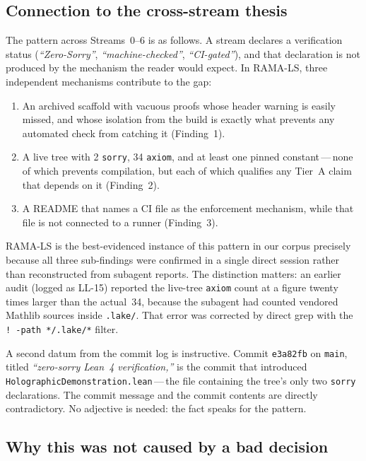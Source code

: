 \subsection*{Connection to the cross-stream thesis}

The pattern across Streams~0--6 is as follows.
A stream declares a verification status (\textit{``Zero-Sorry''},
\textit{``machine-checked''}, \textit{``CI-gated''}), and that
declaration is not produced by the mechanism the reader would expect.
In RAMA-LS, three independent mechanisms contribute to the gap:
\begin{enumerate}
  \item An archived scaffold with vacuous proofs whose header warning
    is easily missed, and whose isolation from the build is exactly what
    prevents any automated check from catching it (Finding~1).
  \item A live tree with 2 \texttt{sorry}, 34 \texttt{axiom}, and at
    least one pinned constant\,---\,none of which prevents compilation,
    but each of which qualifies any Tier~A claim that depends on it
    (Finding~2).
  \item A README that names a CI file as the enforcement mechanism,
    while that file is not connected to a runner (Finding~3).
\end{enumerate}

RAMA-LS is the best-evidenced instance of this pattern in our corpus
precisely because all three sub-findings were confirmed in a single direct
session rather than reconstructed from subagent reports.
The distinction matters: an earlier audit (logged as LL-15) reported the
live-tree \texttt{axiom} count at a figure twenty times larger than the
actual~34, because the subagent had counted vendored Mathlib sources
inside \texttt{.lake/}.
That error was corrected by direct grep with the
\texttt{!\ -path */.lake/*} filter.

A second datum from the commit log is instructive.
Commit \texttt{e3a82fb} on \texttt{main}, titled
\textit{``zero-sorry Lean~4 verification,''}
is the commit that introduced \texttt{HolographicDemonstration.lean}\,---\,the
file containing the tree's only two \texttt{sorry} declarations.
The commit message and the commit contents are directly contradictory.
No adjective is needed: the fact speaks for the pattern.

\subsection*{Why this was not caused by a bad decision}

